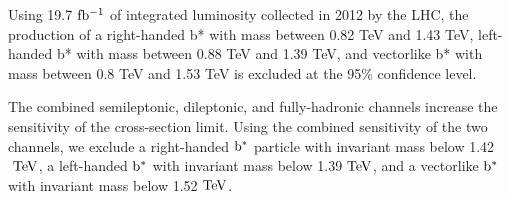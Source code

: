 Using 19.7$~\mathrm{fb^{-1}}$ of integrated luminosity collected in 2012 by the
LHC, the production of a right-handed b* with mass between 0.82 TeV and 1.43 TeV, 
left-handed b* with mass between 0.88 TeV and 1.39 TeV, 
and vectorlike b* with mass between 0.8 TeV and 1.53 TeV is excluded at the 95\% confidence level.

The combined semileptonic, dileptonic, and fully-hadronic channels increase the sensitivity of the cross-section limit.  
Using the combined sensitivity of the two channels, we exclude a right-handed $\mathrm{b}^{*}$ particle with invariant mass below 1.42$~\mathrm{TeV}$, 
a left-handed $\mathrm{b}^{*}$ with invariant mass below 1.39$~\mathrm{TeV}$, and a vectorlike $\mathrm{b}^{*}$ with invariant mass below 1.52$~\mathrm{TeV}$.

